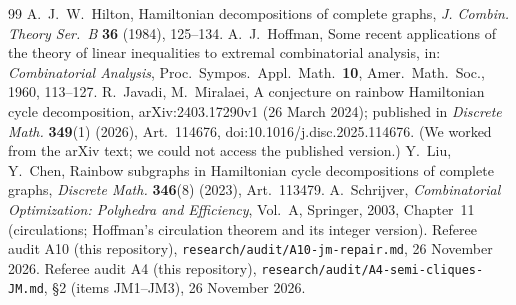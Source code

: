 \documentclass[11pt]{amsart}
\theoremstyle{definition}
\theoremstyle{remark}
\begin{document}
\begin{thebibliography}{99}
 A.~J.~W.~Hilton, Hamiltonian decompositions of complete graphs,
\emph{J. Combin. Theory Ser.~B} \textbf{36} (1984), 125--134.
 A.~J.~Hoffman, Some recent applications of the theory of linear inequalities
to extremal combinatorial analysis, in: \emph{Combinatorial Analysis}, Proc.\ Sympos.\ Appl.\
Math.\ \textbf{10}, Amer.\ Math.\ Soc., 1960, 113--127.
 R.~Javadi, M.~Miralaei, A conjecture on rainbow Hamiltonian cycle decomposition,
arXiv:2403.17290v1 (26 March 2024); published in \emph{Discrete Math.} \textbf{349}(1) (2026),
Art.~114676, doi:10.1016/j.disc.2025.114676. (We worked from the arXiv text; we could not
access the published version.)
 Y.~Liu, Y.~Chen, Rainbow subgraphs in Hamiltonian cycle decompositions of
complete graphs, \emph{Discrete Math.} \textbf{346}(8) (2023), Art.~113479.
\bibitem{Schrijver} A.~Schrijver, \emph{Combinatorial Optimization: Polyhedra and Efficiency},
Vol.~A, Springer, 2003, Chapter~11 (circulations; Hoffman's circulation theorem and its integer
version).
 Referee audit A10 (this repository), \nolinkurl{research/audit/A10-jm-repair.md},
26 November 2026.
 Referee audit A4 (this repository), \nolinkurl{research/audit/A4-semi-cliques-JM.md},
\S2 (items JM1--JM3), 26 November 2026.
\end{thebibliography}
\end{document}
